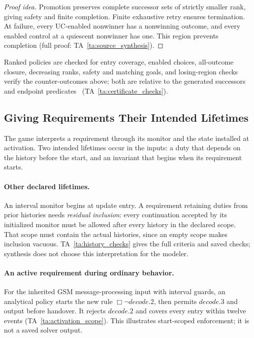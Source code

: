 \documentclass[acmsmall,screen,review,anonymous]{acmart}
\begin{document}

\begin{proof}[Proof idea]
Promotion preserves complete successor sets of strictly smaller rank, giving safety and finite completion. Finite exhaustive retry ensures termination. At failure, every UC-enabled nonwinner has a nonwinning outcome, and every enabled control at a quiescent nonwinner has one. This region prevents completion (full proof: TA~\ref{ta:source_synthesis}).
\end{proof}
Ranked policies are checked for entry coverage, enabled choices, all-outcome closure, decreasing ranks, safety and matching goals, and losing-region checks verify the counter-outcomes above; both are relative to the generated successors and endpoint predicates~\cite{HofmannEtAl2016MuCertificates} (TA~\ref{ta:certificate_checks}).

\label{sec:exploration-unit}\label{thm:lazy-separation}

\subsection{Giving Requirements Their Intended Lifetimes}
\label{sec:monitor-meaning}
The game interprets a requirement through its monitor and the state installed at activation. Two intended lifetimes occur in the inputs: a duty that depends on the history before the start, and an invariant that begins when its requirement starts.

\paragraph{Other declared lifetimes.}
An interval monitor begins at update entry. A requirement retaining duties from prior histories needs \emph{residual inclusion}: every continuation accepted by its initialized monitor must be allowed after every history in the declared scope. That scope must contain the actual histories, since an empty scope makes inclusion vacuous. TA~\ref{ta:history_checks} gives the full criteria and saved checks; synthesis does not choose this interpretation for the modeler.


\paragraph{An active requirement during ordinary behavior.}
For the inherited GSM message-processing input with interval guards, an analytical policy starts the new rule $\Box\neg decode.2$, then permits $decode.3$ and output before handover. It rejects $decode.2$ and covers every entry within twelve events (TA~\ref{ta:activation_scope}). This illustrates start-scoped enforcement; it is not a saved solver output.
\end{document}
